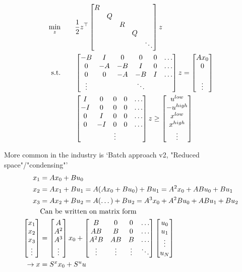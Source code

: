 \documentclass{article}
\begin{document}
\begin{align*}
  \min_z \qquad& \frac{1}{2}z^{\top}\begin{bmatrix} 
    R \\ 
     & Q \\ 
     &  & R \\ 
     &  &  & Q \\ 
     &  &  &  & \ddots
   \end{bmatrix}z \\
  \text{s.t.}\qquad& \begin{bmatrix} 
    -B & I & 0 & 0 & 0 & \dots \\ 
    0 & -A & -B & I & 0 & \dots \\ 
    0 & 0 & -A & -B & I & \dots \\ 
    \vdots &  &  & \ddots  \\ 
   \end{bmatrix}z = \begin{bmatrix} 
    Ax_0 \\ 
    0 \\  \\ \vdots \\ 
   \end{bmatrix} \\ 
  & \begin{bmatrix} 
    I & 0 & 0 & 0 & \dots \\ 
    -I & 0 & 0 & 0 & \dots \\ 
    0 & I & 0 & 0 & \dots \\ 
    0 & -I & 0 & 0 & \dots \\ 
     &  & \vdots
   \end{bmatrix}z \geq \begin{bmatrix} u^{low} \\ -u^{high} \\ x^{low} \\ x^{high} \\ \vdots \end{bmatrix}
\end{align*}

More common in the industry is `Batch approach v2, "Reduced space"/"condensing"'
\begin{align*}
  x_1 &= Ax_0+Bu_0 \\ 
  x_2 &= Ax_1+Bu_1 = A(Ax_0+Bu_0) + Bu_1 = A^2x_0+ABu_0+Bu_1 \\ 
  x_3 &= Ax_2+Bu_2= A(\dots)+Bu_2 = A^3x_0 + A^2Bu_0 + ABu_1+Bu_2 \\ 
  &\text{Can be written on matrix form} \\ 
  \begin{bmatrix} x_1 \\ x_2 \\ x_3 \\ \vdots \end{bmatrix} &= \begin{bmatrix} A \\ A^2 \\ A^3 \\ \vdots \end{bmatrix}x_0 + \begin{bmatrix} B & 0 & 0 & \dots \\ AB & B & 0 & \dots \\ A^2B & AB & B & \dots \\ \vdots & \vdots & \vdots & \ddots \end{bmatrix}
  \begin{bmatrix} u_0 \\ u_1 \\ \vdots \\ u_N \end{bmatrix}  \\ 
  \rightarrow x &= S^{x}x_0 + S^{u} u
\end{align*}
\end{document}
